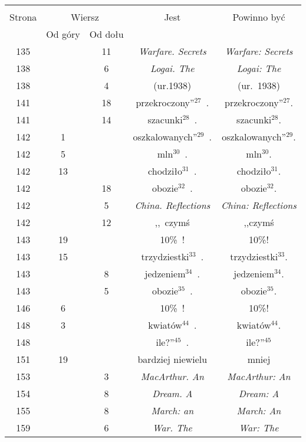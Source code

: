 \documentclass[a4paper,11pt]{article}
\begin{document}
\begin{center}
  \begin{tabular}{|c|c|c|c|c|}
    \hline
    & \multicolumn{2}{c|}{} & & \\
    Strona & \multicolumn{2}{c|}{Wiersz} & Jest
                              & Powinno być \\ \cline{2-3}
    & Od góry & Od dołu & & \\
    \hline
    135 & & 11 & \emph{Warfare. Secrets} & \emph{Warfare: Secrets} \\
    138 & &  6 & \emph{Logai. The} & \emph{Logai: The} \\
    138 & &  4 & (ur.1938) & (ur.~1938) \\
    141 & & 18 & przekroczony''$^{ 27 }$~. & przekroczony''$^{ 27 }$. \\
    141 & & 14 & szacunki$^{ 28 }$~. & szacunki$^{ 28 }$. \\
    142 &  1 & & oszkalowanych''$^{ 29 }$~. & oszkalowanych''$^{ 29 }$. \\
    142 &  5 & & mln$^{ 30 }$~. & mln$^{ 30 }$. \\
    142 & 13 & & chodziło$^{ 31 }$~. & chodziło$^{ 31 }$. \\
    142 & & 18 & obozie$^{ 32 }$~. & obozie$^{ 32 }$. \\
    142 & &  5 & \emph{China. Reflections} & \emph{China: Reflections} \\
    142 & & 12 & ,,~czymś  %
           & ,,czymś  %
    \\
    143 & 19 & & 10\%~! & 10\%! \\
    143 & 15 & & trzydziestki$^{ 33 }$~. & trzydziestki$^{ 33 }$. \\
    143 & &  8 & jedzeniem$^{ 34 }$~. & jedzeniem$^{ 34 }$. \\
    143 & &  5 & obozie$^{ 35 }$~.  & obozie$^{ 35 }$. \\
    146 &  6 & & 10\%~! & 10\%! \\
    148 &  3 & & kwiatów$^{ 44 }$~. & kwiatów$^{ 44 }$. \\
    148 & & & ile?''$^{ 45 }$~. & ile?''$^{ 45 }$ \\
    151 & 19 & & bardziej niewielu & mniej \\
    153 & &  3 & \emph{MacArthur. An} & \emph{MacArthur: An} \\
    154 & &  8 & \emph{Dream. A} & \emph{Dream: A} \\
    155 & &  8 & \emph{March: an} & \emph{March: An} \\
    159 & &  6 & \emph{War. The} & \emph{War: The} \\

\end{tabular}
\end{center}
\end{document}
